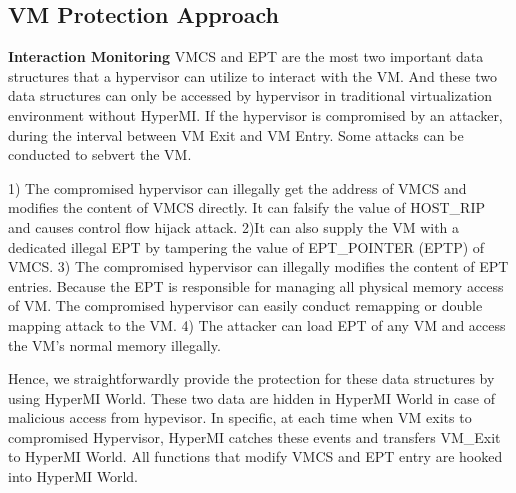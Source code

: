\documentclass[conference]{IEEEtran}
\begin{document}
\subsection{VM Protection Approach}

\textbf{Interaction Monitoring}\label {interaction}
 VMCS and EPT are the most two important data structures that a hypervisor can utilize to interact with the VM. And these two data structures can only be accessed by hypervisor in traditional virtualization environment without HyperMI. If the hypervisor is compromised by an attacker, during the interval between VM Exit and VM Entry. Some attacks can be conducted to sebvert the VM. 

1) The compromised hypervisor can illegally get the address of VMCS and modifies the content of VMCS directly. It can falsify the value of HOST\_RIP and causes control flow hijack attack.
2)It can also supply the VM with a dedicated illegal EPT by tampering the value of EPT\_POINTER (EPTP) of VMCS. 
3) The compromised hypervisor can illegally modifies the content of EPT entries. Because the EPT is responsible for managing all physical memory access of VM. The compromised hypervisor can easily conduct remapping or double mapping attack to the VM.
4) The attacker can load EPT of any VM and access the VM's normal memory illegally.

Hence, we straightforwardly provide the protection for these data structures by using HyperMI World. These two data are hidden in HyperMI World in case of malicious access from hypevisor. In specific, at each time when VM exits to compromised Hypervisor, HyperMI catches these events and transfers VM\_Exit to HyperMI World. All functions that modify VMCS and EPT entry are hooked into HyperMI World.
\end{document}
